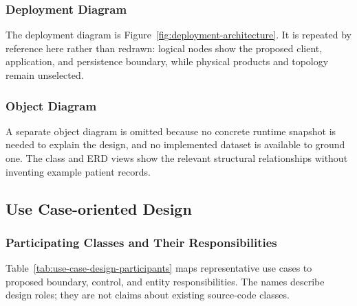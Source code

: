 \documentclass[a4paper,12pt]{article}
\begin{document}
\subsubsection{Deployment Diagram}

The deployment diagram is Figure~\ref{fig:deployment-architecture}. It is repeated by reference here rather than redrawn: logical nodes show the proposed client, application, and persistence boundary, while physical products and topology remain unselected.

\subsubsection{Object Diagram}

A separate object diagram is omitted because no concrete runtime snapshot is needed to explain the design, and no implemented dataset is available to ground one. The class and ERD views show the relevant structural relationships without inventing example patient records.

\subsection{Use Case-oriented Design}

\subsubsection{Participating Classes and Their Responsibilities}

Table~\ref{tab:use-case-design-participants} maps representative use cases to proposed boundary, control, and entity responsibilities. The names describe design roles; they are not claims about existing source-code classes.
\end{document}
